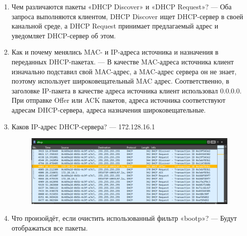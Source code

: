 \begin{enumerate}
    \item Чем различаются пакеты «DHCP Discover» и «DHCP Request»? --- Оба запроса выполняются клиентом, DHCP Discover ищет DHCP-сервер в своей 
канальной среде, а DHCP Request принимает предлагаемый адрес и уведомляет 
DHCP-сервер об этом.
    \item Как и почему менялись MAC- и IP-адреса источника и назначения в 
    переданных DHCP-пакетах. --- В качестве MAC-адреса источника клиент изначально подставил свой MAC-адрес, а MAC-адрес сервера он не знает, поэтому использует широковещательный MAC адрес. Соответственно, в заголовке IP-пакета в качестве адреса источника клиент 
    использовал 0.0.0.0. При отправке Offer или ACK пакетов, адреса источника 
    соответствуют адресам DHCP-сервера, адреса назначения широковещательные.
    \item Каков IP-адрес DHCP-сервера? --- 172.128.16.1
    \begin{figure}[H]
        \centering
        \includegraphics[width=1\linewidth]{res/dhcp-server-ip.png}
    \end{figure}
    \item Что произойдёт, если очистить использованный фильтр «bootp»? --- Будут отображаться все пакеты.
\end{enumerate}

